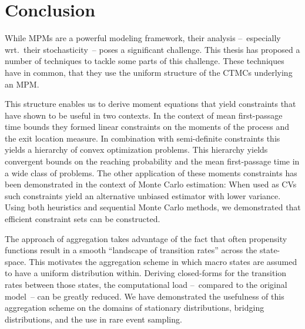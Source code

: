 \chapter{Conclusion}
While \acfp{MPM} are a powerful modeling framework, their analysis --~especially wrt.\ their stochasticity~-- poses a significant challenge.
This thesis has proposed a number of techniques to tackle some parts of this challenge.
These techniques have in common, that they use the uniform structure of the \acp{CTMC} underlying an \ac{MPM}.

This structure enables us to derive moment equations that yield constraints that have shown to be useful in two contexts.
In the context of mean first-passage time bounds they formed linear constraints on the moments of the process and the exit location measure.
In combination with semi-definite constraints this yields a hierarchy of convex optimization problems.
This hierarchy yields convergent bounds on the reaching probability and the mean first-passage time in a wide class of problems.
The other application of these moments constraints has been demonstrated in the context of Monte Carlo estimation:
When used as \acfp{CV} such constraints yield an alternative unbiased estimator with lower variance.
Using both heuristics and sequential Monte Carlo methods, we demonstrated that efficient constraint sets can be constructed.

The approach of aggregation takes advantage of the fact that often propensity functions result in a smooth ``landscape of transition rates'' across the state-space.
This motivates the aggregation scheme in which macro states are assumed to have a uniform distribution within.
Deriving closed-forms for the transition rates between those states, the computational load --~compared to the original model~-- can be greatly reduced.
We have demonstrated the usefulness of this aggregation scheme on the domains of stationary distributions, bridging distributions, and the use in rare event sampling.


